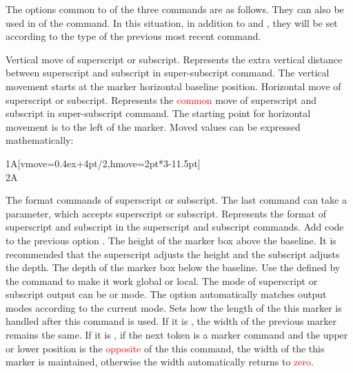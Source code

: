 \documentclass[load-preamble+]{cnltx-doc}
\renewcommand{\emph}[1]{\textcolor{red}{#1}}
\begin{document}
The options common to  of the three commands are as follows. They can also be used in  of the  command. In this situation, in addition to  and , they will be set according to the type of the previous most recent command.
\begin{options}
  \Default{0pt}
  Vertical move of superscript or subscript. Represents the extra vertical distance  between superscript and subscript in super-subscript command. The vertical movement starts at the marker horizontal baseline position.
  \Default{0pt}
  Horizontal move of superscript or subscript. Represents the \emph{common} move of superscript and subscript in super-subscript command. The starting point for horizontal movement is to the left of the marker. Moved values can be expressed mathematically:
  \begin{example}
  1A[vmove=0.4ex+4pt/2,hmove=2pt*3-11.5pt] \\
  2A
  \end{example}
  The format commands of superscript or subscript. The last command can take a parameter, which accepts superscript or subscript. Represents the format of superscript and subscript in the superscript and subscript commands.
  Add code to the previous option .
  The height of the marker box above the baseline. It is recommended that the superscript adjusts the height and the subscript adjusts the depth.
  The depth of the marker box below the baseline.
  Use the  defined by the  command to make it work global or local.
  The mode of superscript or subscript output can be  or  mode. The  option automatically matches output modes according to the current mode.
  Sets how the length of the this marker is handled after this command is used. If it is , the width of the previous marker remains the same. If it is , if the next token is a marker command and the upper or lower position is the \textcolor{red}{opposite} of the this command, the width of the this marker is maintained, otherwise the width automatically returns to \textcolor{red}{zero}.
  \begin{example}

\end{example}
\end{options}
\end{document}
